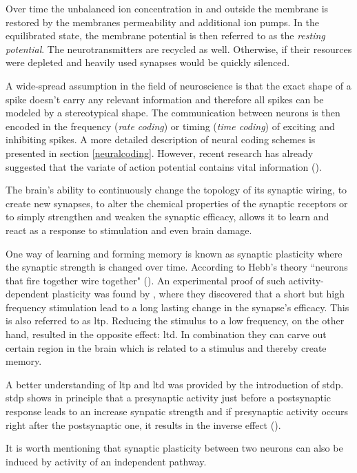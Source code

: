 Over time the unbalanced ion concentration in and outside the membrane is restored by the membranes permeability and additional ion pumps. In the equilibrated state, the membrane potential is then referred to as the \emph{resting potential}. The neurotransmitters are recycled as well. Otherwise, if their resources were depleted and heavily used synapses would be quickly silenced.

A wide-spread assumption in the field of neuroscience is that the exact shape of a spike doesn't carry any relevant information and therefore all spikes can be modeled by a stereotypical shape. The communication between neurons is then encoded in the frequency (\emph{rate coding}) or timing (\emph{time coding}) of exciting and inhibiting spikes. A more detailed description of neural coding schemes is presented in section \ref{neuralcoding}. However, recent research has already suggested that the variate of action potential contains vital information (\cite{debanne2013mechanisms}).

The brain's ability to continuously change the topology of its synaptic wiring, to create new synapses, to alter the chemical properties of the synaptic receptors or to simply strengthen and weaken the synaptic efficacy, allows it to learn and react as a response to stimulation and even brain damage.

One way of learning and forming memory is known as synaptic plasticity where the synaptic strength is changed over time. According to Hebb's theory ``neurons that fire together wire together" (\cite{hebb1949organization}). An experimental proof of such activity-dependent plasticity was found by \cite{bliss1973long}, where they discovered that a short but high frequency stimulation lead to a long lasting change in the synapse's efficacy. This is also referred to as \gls{ltp}. Reducing the stimulus to a low frequency, on the other hand, resulted in the opposite effect: \gls{ltd}. In combination they can carve out certain region in the brain which is related  to a stimulus and thereby create memory. 

A better understanding of \gls{ltp} and \gls{ltd} was provided by the introduction of \gls{stdp}. \gls{stdp} shows in principle that a presynaptic activity just before a postsynaptic response leads to an increase synpatic strength and if presynaptic activity occurs right after the postsynaptic one, it results in the inverse effect (\cite{poo98stdp}). 

It is worth mentioning that synaptic plasticity between two neurons can also be induced by activity of an independent pathway. 

